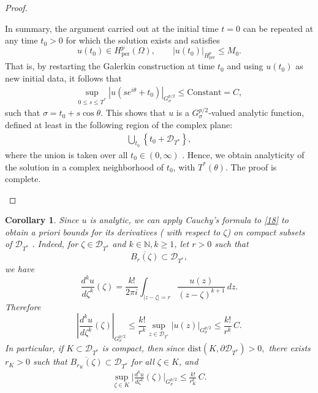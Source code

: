 \documentclass[12pt]{article}
\theoremstyle{plain}
\newtheorem{corollary}{Corollary}
\theoremstyle{remark}
\newcommand{\Hper}{H_{\mathrm{per}}}
\newcommand{\Gspace}{G_\sigma^{p/2}}
\begin{document}
\begin{proof}
\begin{enumerate}
In summary, the argument carried out at the initial time $t=0$ can be repeated at
any time $t_0>0$ for which the solution exists and satisfies
\[
u(t_0) \in H^p_{\mathrm{per}}(\Omega), \qquad
|u(t_0)|_{\Hper^p} \leq M_0.
\]
That is, by restarting the Galerkin construction at time $t_0$ and using $u(t_0)$ as new
initial data, it follows that 
\begin{align*}
     \sup_{0\leq s\leq T^*} \left| u(se^{i\theta}+t_0) \right|_{\Gspace} \leq\text{Constant} = C,  
\end{align*}  
such that $\sigma=t_0+s\cos\theta$. This shows that \( u \) is a \( \Gspace \)-valued analytic function, defined at least in the following region of the complex plane:
\begin{align*}
    \bigcup_{t_0} \left\{ t_0 + \mathcal D_{T^*} \right\},
\end{align*}
where the union is taken over all \( t_0 \in (0,\infty) \) .
Hence, we obtain analyticity of the solution in a complex neighborhood of
$t_0$, with $T^* (\theta)$. The proof is complete.
\end{enumerate}
\end{proof}

\begin{corollary}
Since $u$ is analytic, we can apply Cauchy's formula to \eqref{18} to obtain a priori bounds for its derivatives ( with respect to $\zeta$) on compact subsets of $\mathcal D_{T^*}$ \cite{Evgrafov2019}. Indeed, for $\zeta\in \mathcal D_{T^*}$ and $k\in\mathbb{N},k\geq1 $, let $r>0$  such that
\[
\overline{B_r(\zeta)} \subset \mathcal D_{T^*},
\] 
we have
\[
\frac{d^k u}{d\zeta^k}(\zeta)
=
\frac{k!}{2\pi i}
\int_{|z-\zeta|=r}
\frac{u(z)}{(z-\zeta)^{k+1}}\, dz.
\]
Therefore
\[
\left\lvert \frac{d^k u}{d\zeta^k}(\zeta) \right\rvert_{\Gspace}
\le\frac{k!}{r^k}\sup_{z\in \mathcal D_{T^*}}|u(z)|_{G_{\sigma}^{p/2}}\le
\frac{k!}{r^k}\, C.
\]
In particular, if $K \subset \mathcal D_{T^*}$ is compact, then since \(\mathrm{dist}(K,\partial \mathcal D_{T^*})>0,\) there exists $r_K>0$ such that
$\overline{B_{r_K}(\zeta)} \subset \mathcal D_{T^*}$ for all $\zeta \in K$, and
\begin{align}
    \sup_{\zeta\in K}\lvert \frac{d^k u}{d\zeta^k}(\zeta)|_{G_{\sigma}^{p/2}}
\le
\frac{k!}{r_K^k}\, C.\label{19}
\end{align}
\end{corollary} 
\end{document}
